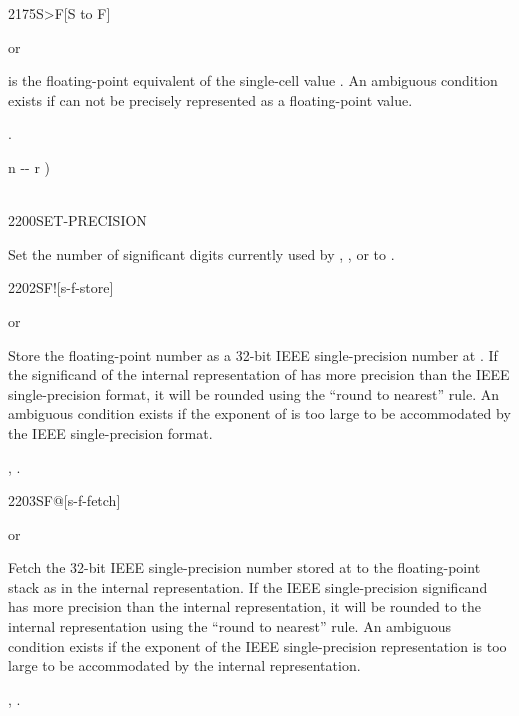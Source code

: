 
\begin{worddef}[StoF]{2175}{S>F}[S to F]
\item {}  or 

	 is the floating-point equivalent of the single-cell
	value .  An ambiguous condition exists if 
	can not be precisely represented as a floating-point value.

\see {}.

	\begin{implement}
		\word{:}   n -{}- r ) \\
		\tab {}  \\
		\word{;}
	\end{implement}
\end{worddef}



\begin{worddef}{2200}{SET-PRECISION}
\item {}

	Set the number of significant digits currently used by ,
	, or  to .
\end{worddef}


\begin{worddef}{2202}{SF!}[s-f-store]
\item {}  or

	Store the floating-point number  as a 32-bit IEEE
	single-precision number at . If the significand
	of the internal representation of  has more precision
	than the IEEE single-precision format, it will be rounded using
	the ``round to nearest'' rule. An ambiguous condition exists if
	the exponent of  is too large to be accommodated by the
	IEEE single-precision format.

\see {},
	.
\end{worddef}


\begin{worddef}{2203}{SF@}[s-f-fetch]
\item {}  or

	Fetch the 32-bit IEEE single-precision number stored at
	 to the floating-point stack as  in the
	internal representation. If the IEEE single-precision
	significand has more precision than the internal representation,
	it will be rounded to the internal representation using the
	``round to nearest'' rule. An ambiguous condition exists if the
	exponent of the IEEE single-precision representation is too
	large to be accommodated by the internal representation.

\see {},
	.
\end{worddef}


